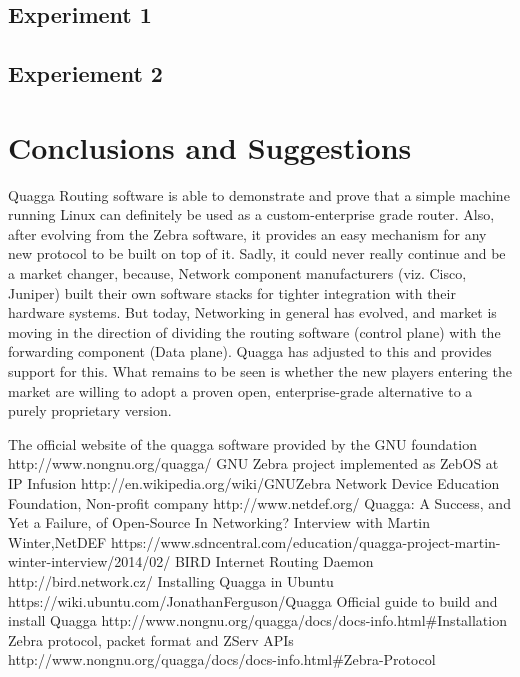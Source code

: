 \documentclass{article}
\begin{document}
\subsection{Experiment 1}
\subsection{Experiement 2}
\clearpage
\section{Conclusions and Suggestions}
Quagga Routing software is able to demonstrate and prove that a simple machine running Linux can definitely
be used as a custom-enterprise grade router. Also, after evolving from the Zebra software, it provides an
easy mechanism for any new protocol to be built on top of it. Sadly, it could never really continue and
be a market changer, because, Network component manufacturers (viz. Cisco, Juniper) built their own software
stacks for tighter integration with their hardware systems. But today, Networking in general has evolved, and
market is moving in the direction of dividing the routing software (control plane) with the forwarding
component (Data plane). Quagga has adjusted to this and provides support for this. What remains to be seen
is whether the new players entering the market are willing to adopt a proven open, enterprise-grade 
alternative to a purely proprietary version.
%
%
\begin{thebibliography}{9}
  The official website of the quagga software provided by the GNU foundation http://www.nongnu.org/quagga/
  GNU Zebra project implemented as ZebOS at IP Infusion http://en.wikipedia.org/wiki/GNU\textunderscore Zebra
   Network Device Education Foundation, Non-profit company http://www.netdef.org/
   Quagga: A Success, and Yet a Failure, of Open-Source In Networking? Interview with Martin Winter,NetDEF https://www.sdncentral.com/education/quagga-project-martin-winter-interview/2014/02/
   BIRD Internet Routing Daemon http://bird.network.cz/
   Installing Quagga in Ubuntu https://wiki.ubuntu.com/JonathanFerguson/Quagga
   Official guide to build and install Quagga http://www.nongnu.org/quagga/docs/docs-info.html\#Installation
   Zebra protocol, packet format and ZServ APIs http://www.nongnu.org/quagga/docs/docs-info.html\#Zebra-Protocol
\end{thebibliography}
\end{document}
